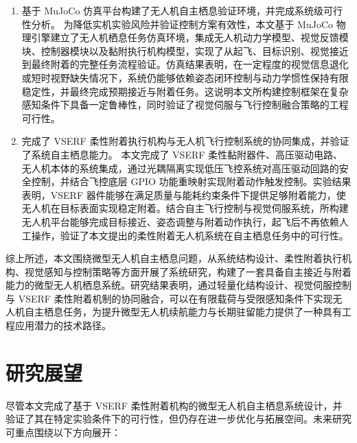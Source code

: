 \begin{enumerate}

\item 基于 MuJoCo 仿真平台构建了无人机自主栖息验证环境，并完成系统级可行性分析。
为降低实机实验风险并验证控制方案有效性，本文基于 MuJoCo 物理引擎建立了无人机栖息任务仿真环境，集成无人机动力学模型、视觉反馈模块、控制器模块以及黏附执行机构模型，实现了从起飞、目标识别、视觉接近到最终附着的完整任务流程验证。仿真结果表明，在一定程度的视觉信息退化或短时视野缺失情况下，系统仍能够依赖姿态闭环控制与动力学惯性保持有限稳定性，并最终完成预期接近与附着任务。这说明本文所构建控制框架在复杂感知条件下具备一定鲁棒性，同时验证了视觉伺服与飞行控制融合策略的工程可行性。

\item 完成了 VSERF 柔性附着执行机构与无人机飞行控制系统的协同集成，并验证了系统自主栖息能力。
本文完成了 VSERF 柔性黏附器件、高压驱动电路、无人机本体的系统集成，通过光耦隔离实现低压飞控系统对高压驱动回路的安全控制，并结合飞控底层 GPIO 功能重映射实现附着动作触发控制。实验结果表明，VSERF 器件能够在满足质量与能耗约束条件下提供足够附着能力，使无人机在目标表面实现稳定附着。结合自主飞行控制与视觉伺服系统，所构建无人机平台能够完成目标接近、姿态调整与附着动作执行，起飞后不再依赖人工操作，验证了本文提出的柔性附着无人机系统在自主栖息任务中的可行性。

\end{enumerate}

\vspace{5pt}

综上所述，本文围绕微型无人机自主栖息问题，从系统结构设计、柔性附着执行机构、视觉感知与控制策略等方面开展了系统研究，构建了一套具备自主接近与附着能力的微型无人机栖息系统。研究结果表明，通过轻量化结构设计、视觉伺服控制与 VSERF 柔性附着机制的协同融合，可以在有限载荷与受限感知条件下实现无人机自主栖息任务，为提升微型无人机续航能力与长期驻留能力提供了一种具有工程应用潜力的技术路径。

\section{研究展望}

尽管本文完成了基于 VSERF 柔性附着机构的微型无人机自主栖息系统设计，并验证了其在特定实验条件下的可行性，但仍存在进一步优化与拓展空间。未来研究可重点围绕以下方向展开：

